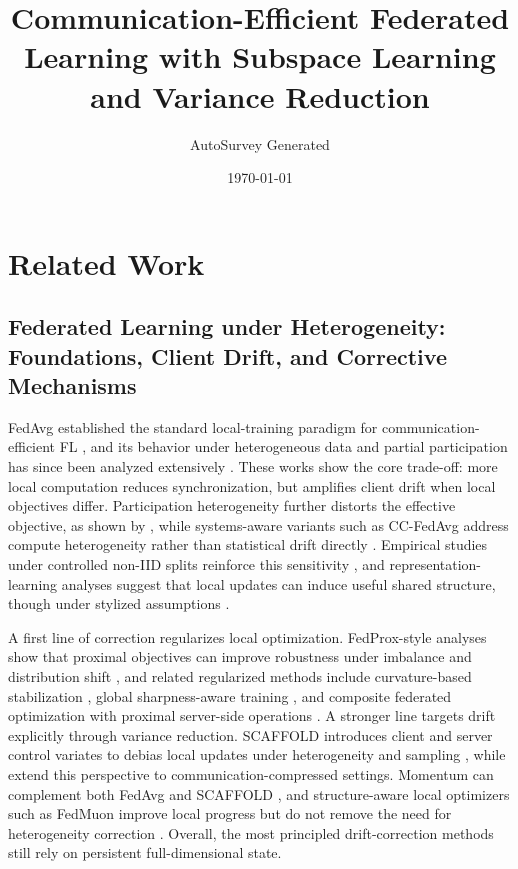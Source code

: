 \documentclass[11pt]{article}
\title{Communication-Efficient Federated Learning with Subspace Learning and Variance Reduction}
\author{AutoSurvey Generated}
\date{\today}
\begin{document}
\maketitle

\section{Related Work}

\subsection{Federated Learning under Heterogeneity: Foundations, Client Drift, and Corrective Mechanisms}

FedAvg established the standard local-training paradigm for communication-efficient FL \citep{mcmahan2017communication}, and its behavior under heterogeneous data and partial participation has since been analyzed extensively \citep{li2019convergence, Yang2021AchievingLS, qu2023unified}. These works show the core trade-off: more local computation reduces synchronization, but amplifies client drift when local objectives differ. Participation heterogeneity further distorts the effective objective, as shown by \citet{xiang2023towards}, while systems-aware variants such as CC-FedAvg address compute heterogeneity rather than statistical drift directly \citep{Zhang2022CCFedAvgCC}. Empirical studies under controlled non-IID splits reinforce this sensitivity \citep{reguieg2023comparative}, and representation-learning analyses suggest that local updates can induce useful shared structure, though under stylized assumptions \citep{collins2022fedavg}.

A first line of correction regularizes local optimization. FedProx-style analyses show that proximal objectives can improve robustness under imbalance and distribution shift \citep{su2023non}, and related regularized methods include curvature-based stabilization \citep{shoham2019overcoming}, global sharpness-aware training \citep{caldarola2025beyond}, and composite federated optimization with proximal server-side operations \citep{Zhou2025FedCanonNC, yuan2020federated}. A stronger line targets drift explicitly through variance reduction. SCAFFOLD introduces client and server control variates to debias local updates under heterogeneity and sampling \citep{karimireddy2020scaffold}, while \citet{Huang2023StochasticCA} extend this perspective to communication-compressed settings. Momentum can complement both FedAvg and SCAFFOLD \citep{Cheng2023MomentumBN}, and structure-aware local optimizers such as FedMuon improve local progress but do not remove the need for heterogeneity correction \citep{liu2025fedmuon}. Overall, the most principled drift-correction methods still rely on persistent full-dimensional state.
\end{document}
